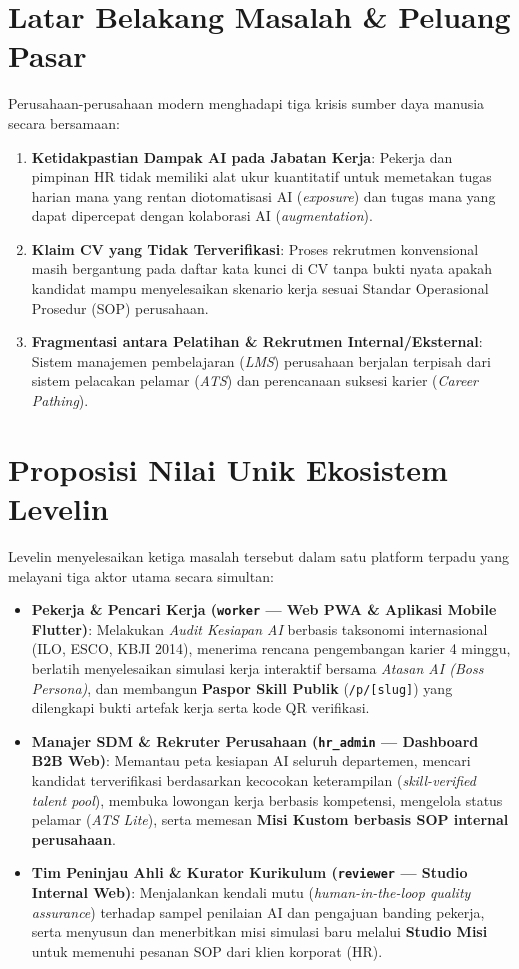 \documentclass[11pt,a4paper]{report}
\begin{document}
\section{Latar Belakang Masalah \& Peluang Pasar}
Perusahaan-perusahaan modern menghadapi tiga krisis sumber daya manusia secara bersamaan:
\begin{enumerate}[leftmargin=1.5em]
    \item \textbf{Ketidakpastian Dampak AI pada Jabatan Kerja}: Pekerja dan pimpinan HR tidak memiliki alat ukur kuantitatif untuk memetakan tugas harian mana yang rentan diotomatisasi AI (\textit{exposure}) dan tugas mana yang dapat dipercepat dengan kolaborasi AI (\textit{augmentation}).
    \item \textbf{Klaim CV yang Tidak Terverifikasi}: Proses rekrutmen konvensional masih bergantung pada daftar kata kunci di CV tanpa bukti nyata apakah kandidat mampu menyelesaikan skenario kerja sesuai Standar Operasional Prosedur (SOP) perusahaan.
    \item \textbf{Fragmentasi antara Pelatihan \& Rekrutmen Internal/Eksternal}: Sistem manajemen pembelajaran (\textit{LMS}) perusahaan berjalan terpisah dari sistem pelacakan pelamar (\textit{ATS}) dan perencanaan suksesi karier (\textit{Career Pathing}).
\end{enumerate}

\section{Proposisi Nilai Unik Ekosistem Levelin}
Levelin menyelesaikan ketiga masalah tersebut dalam satu platform terpadu yang melayani tiga aktor utama secara simultan:
\begin{itemize}[leftmargin=1.5em]
    \item \textbf{Pekerja \& Pencari Kerja (\texttt{worker} --- Web PWA \& Aplikasi Mobile Flutter)}:
    Melakukan \textit{Audit Kesiapan AI} berbasis taksonomi internasional (ILO, ESCO, KBJI 2014), menerima rencana pengembangan karier 4 minggu, berlatih menyelesaikan simulasi kerja interaktif bersama \textit{Atasan AI (Boss Persona)}, dan membangun \textbf{Paspor Skill Publik} (\texttt{/p/[slug]}) yang dilengkapi bukti artefak kerja serta kode QR verifikasi.
    \item \textbf{Manajer SDM \& Rekruter Perusahaan (\texttt{hr\_admin} --- Dashboard B2B Web)}:
    Memantau peta kesiapan AI seluruh departemen, mencari kandidat terverifikasi berdasarkan kecocokan keterampilan (\textit{skill-verified talent pool}), membuka lowongan kerja berbasis kompetensi, mengelola status pelamar (\textit{ATS Lite}), serta memesan \textbf{Misi Kustom berbasis SOP internal perusahaan}.
    \item \textbf{Tim Peninjau Ahli \& Kurator Kurikulum (\texttt{reviewer} --- Studio Internal Web)}:
    Menjalankan kendali mutu (\textit{human-in-the-loop quality assurance}) terhadap sampel penilaian AI dan pengajuan banding pekerja, serta menyusun dan menerbitkan misi simulasi baru melalui \textbf{Studio Misi} untuk memenuhi pesanan SOP dari klien korporat (HR).
\end{itemize}
\end{document}
